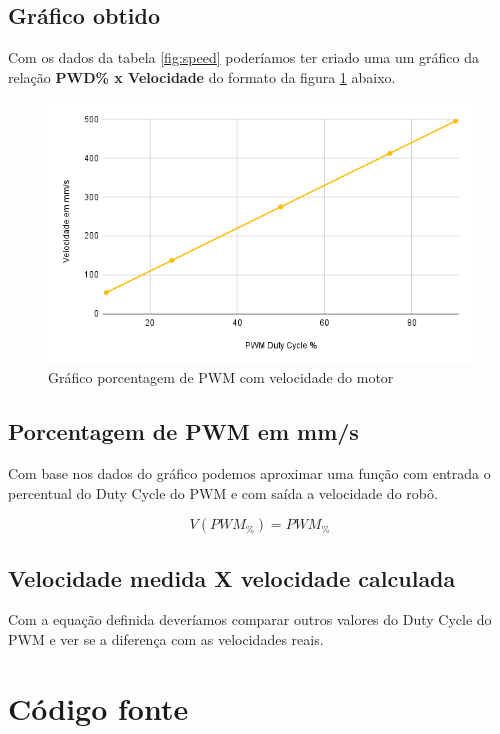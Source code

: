 \documentclass{article}
\begin{document}
\subsection{Gráfico obtido}


Com os dados da tabela \ref{fig:speed} poderíamos ter criado uma um gráfico da relação \textbf{PWD\% x Velocidade} do formato da figura \ref{fig:grafPWMvel} abaixo.

\begin{figure}[H]
    \centering
    \includegraphics[width = .8\linewidth]{images/SpeedXPWM.png}
    \caption{Gráfico porcentagem de PWM com velocidade do motor}
    \label{fig:grafPWMvel}
\end{figure}

\subsection{Porcentagem de PWM em mm/s}

Com base nos dados do gráfico podemos aproximar uma função com entrada o percentual do Duty Cycle do PWM e com saída a velocidade do robô.

\begin{equation*}
    V(PWM_\%)  =  PWM_\%
\end{equation*}

\subsection{Velocidade medida X velocidade calculada}

Com a equação definida deveríamos comparar outros valores do Duty Cycle do PWM e ver se a diferença com as velocidades reais.
\section{Código fonte}
\end{document}
